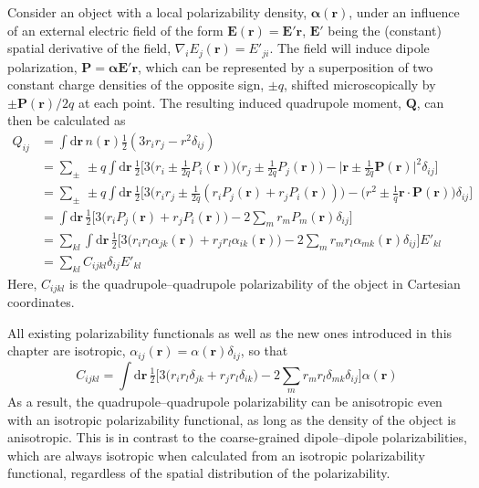 Consider an object with a local polarizability density, $\boldsymbol\alpha(\mathbf r)$, under an influence of an external electric field of the form $\mathbf E(\mathbf r)=\mathbf E'\mathbf r$, $\mathbf E'$ being the (constant) spatial derivative of the field, $\nabla_i E_j(\mathbf r)=E'_{ji}$.
The field will induce dipole polarization, $\mathbf P=\boldsymbol\alpha\mathbf E'\mathbf r$, which can be represented by a superposition of two constant charge densities of the opposite sign, $\pm q$, shifted microscopically by $\pm\mathbf P(\mathbf r)/2q$ at each point.
The resulting induced quadrupole moment, $\mathbf Q$, can then be calculated as
\begin{equation}
\begin{aligned}
Q_{ij}&=\int\mathrm d\mathbf r\,n(\mathbf r)\tfrac12(3r_i r_j-r^2\delta_{ij}) \\
&=\sum_\pm\,\pm q\int\mathrm d\mathbf r\,\tfrac12\big[3\big(r_i\pm\tfrac1{2q}P_i(\mathbf r)\big)\big(r_j\pm\tfrac1{2q}P_j(\mathbf r)\big)-\big|\mathbf r\pm\tfrac1{2q}\mathbf P(\mathbf r)\big|^2\delta_{ij}\big] \\
&=\sum_\pm\,\pm q\int\mathrm d\mathbf r\,\tfrac12\big[3\big(r_i r_j\pm\tfrac1{2q}(r_i P_j(\mathbf r)+r_j P_i(\mathbf r)\!)\big)-\big(r^2\pm\tfrac1q\mathbf r\cdot\mathbf P(\mathbf r)\!\big)\delta_{ij}]\\
&=\int\mathrm d\mathbf r\,\tfrac12\big[3\big(r_i P_j(\mathbf r)+r_j P_i(\mathbf r)\!\big)-2{\textstyle\sum_m}r_m P_m(\mathbf r)\delta_{ij}] \\
&=\sum_{kl}\int\mathrm d\mathbf r\,\tfrac12\big[3\big(r_i r_l\alpha_{jk}(\mathbf r)+r_j r_l\alpha_{ik}(\mathbf r)\!\big)-2{\textstyle\sum_m}r_m r_l\alpha_{mk}(\mathbf r)\delta_{ij}]E'_{kl} \\
&=\sum_{kl}C_{ijkl}\delta_{ij}E'_{kl}
\end{aligned}
\end{equation}
Here, $C_{ijkl}$ is the quadrupole--quadrupole polarizability of the object in Cartesian coordinates.

All existing polarizability functionals as well as the new ones introduced in this chapter are isotropic, $\alpha_{ij}(\mathbf r)=\alpha(\mathbf r)\delta_{ij}$, so that
\begin{equation}
C_{ijkl}=\int\mathrm d\mathbf r\,\tfrac12\big[3\big(r_i r_l\delta_{jk}+r_j r_l\delta_{ik}\!\big)-2{\textstyle\sum_m}r_m r_l\delta_{mk}\delta_{ij}\big]\alpha(\mathbf r)
\end{equation}
As a result, the quadrupole--quadrupole polarizability can be anisotropic even with an isotropic polarizability functional, as long as the density of the object is anisotropic.
This is in contrast to the coarse-grained dipole--dipole polarizabilities, which are always isotropic when calculated from an isotropic polarizability functional, regardless of the spatial distribution of the polarizability.


